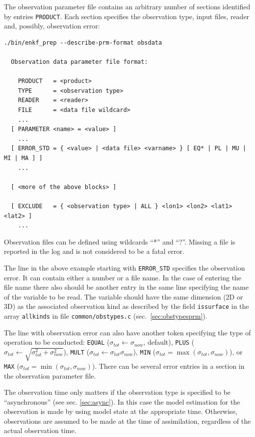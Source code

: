 \documentclass[11pt]{report}
\begin{document}
The observation parameter file contains an arbitrary number of sections identified by entries \verb|PRODUCT|.
Each section specifies the observation type, input files, reader and, possibly, observation error:
\begin{Verbatim}[frame=single,fontsize=\footnotesize]
./bin/enkf_prep --describe-prm-format obsdata

  Observation data parameter file format:

    PRODUCT   = <product>
    TYPE      = <observation type>
    READER    = <reader>
    FILE      = <data file wildcard> 
    ...
  [ PARAMETER <name> = <value> ]
    ...
  [ ERROR_STD = { <value> | <data file> <varname> } [ EQ* | PL | MU | MI | MA ] ]
    ...

  [ <more of the above blocks> ]

  [ EXCLUDE   = { <observation type> | ALL } <lon1> <lon2> <lat1> <lat2> ]
    ...
\end{Verbatim}
Observation files can be defined using wildcards ``*'' and ``?''.
Missing a file is reported in the log and is not considered to be a fatal error.

The line in the above example starting with \verb|ERROR_STD| specifies the observation error.
It can contain either a number or a file name.
In the case of entering the file name there also should be another entry in the same line specifying the name of the variable to be read.
The variable should have the same dimension (2D or 3D) as the associated observation kind as described by the field \verb|issurface| in the array \verb|allkinds| in file \verb|common/obstypes.c| (sec.~\ref{sec:obstypesprm}).

The line with observation error can also have another token specifying the type of operation to be conducted: \verb|EQUAL| ($\sigma_{tot} \leftarrow \sigma_{now}$, default), \verb|PLUS| ($\sigma_{tot} \leftarrow \sqrt{\sigma_{tot}^2 + \sigma_{now}^2}$), \verb|MULT| ($\sigma_{tot} \leftarrow \sigma_{tot} \sigma_{now}$), \verb|MIN| ($\sigma_{tot} = \max(\sigma_{tot}, \sigma_{now})$), or \verb|MAX| ($\sigma_{tot} = \min(\sigma_{tot}, \sigma_{now})$).
There can be several error entries in a section in the observation parameter file.

The observation time only matters if the observation type is specified to be ``asynchronous'' (see sec. \ref{sec:async}).
In this case the model estimation for the observation is made by using model state at the appropriate time.
Otherwise, observations are assumed to be made at the time of assimilation, regardless of the actual observation time.
\end{document}
